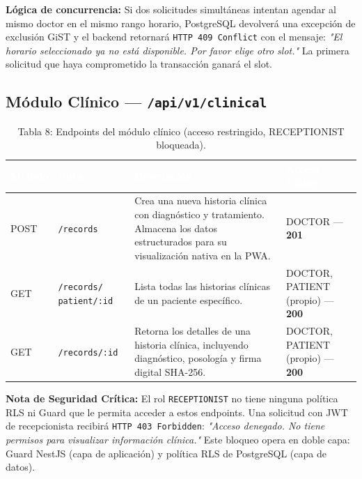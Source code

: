 \documentclass[a4paper,12pt]{article}
\renewcommand{\arraystretch}{1.1}
\begin{document}
\textbf{Lógica de concurrencia:} Si dos solicitudes simultáneas intentan agendar al mismo doctor en el mismo rango horario, PostgreSQL devolverá una excepción de exclusión GiST y el backend retornará \texttt{HTTP 409 Conflict} con el mensaje: \textit{"El horario seleccionado ya no está disponible. Por favor elige otro slot."} La primera solicitud que haya comprometido la transacción ganará el slot.

\subsection{Módulo Clínico — \texttt{/api/v1/clinical}}

\begin{table}[H]
\centering
\small
\renewcommand{\arraystretch}{1.6}
\begin{tabular}{|p{1.6cm}|p{3.2cm}|p{5.0cm}|p{3.4cm}|}
\hline
\rowcolor{SKTPrimary}
\textcolor{white}{\textbf{Método}} &
\textcolor{white}{\textbf{Ruta}} &
\textcolor{white}{\textbf{Descripción}} &
\textcolor{white}{\textbf{Acceso / Código}} \\
\hline
\rowcolor{rowPOST}
POST & \texttt{/records} & Crea una nueva historia clínica con diagnóstico y tratamiento. Almacena los datos estructurados para su visualización nativa en la PWA. & DOCTOR — \textbf{201} \\
\hline
\rowcolor{rowGET}
GET & \texttt{/records/} \texttt{patient/:id} & Lista todas las historias clínicas de un paciente específico. & DOCTOR, PATIENT (propio) — \textbf{200} \\
\hline
\rowcolor{rowGET}
GET & \texttt{/records/:id} & Retorna los detalles de una historia clínica, incluyendo diagnóstico, posología y firma digital SHA-256. & DOCTOR, PATIENT (propio) — \textbf{200} \\
\hline
\end{tabular}
\caption*{Tabla 8: Endpoints del módulo clínico (acceso restringido, RECEPTIONIST bloqueada).}
\end{table}

\textbf{Nota de Seguridad Crítica:} El rol \texttt{RECEPTIONIST} no tiene ninguna política RLS ni Guard que le permita acceder a estos endpoints. Una solicitud con JWT de recepcionista recibirá \texttt{HTTP 403 Forbidden}: \textit{"Acceso denegado. No tiene permisos para visualizar información clínica."} Este bloqueo opera en doble capa: Guard NestJS (capa de aplicación) y política RLS de PostgreSQL (capa de datos).
\end{document}
